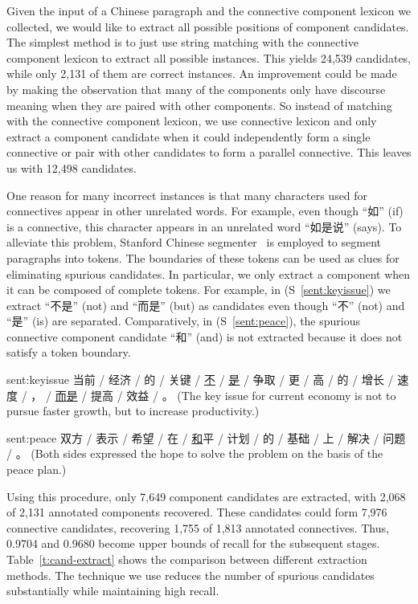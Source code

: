 Given the input of a Chinese paragraph and the connective component lexicon we collected,
we would like to extract all possible positions of component candidates.
The simplest method is to just use string matching with the connective
component lexicon to extract all possible instances. This yields
24,539 candidates, while only 2,131 of them are correct instances. An improvement
could be made by making the observation that many of the components only have
discourse meaning when they are paired with other components. So instead of matching
with the connective component lexicon, we use connective lexicon and only extract
a component candidate when it could independently form a single connective or pair
with other candidates to form a parallel connective.
This leaves us with 12,498 candidates.

One reason for many incorrect instances is that many characters used for connectives
appear in other unrelated words. For example, even though ``如'' (if) is a connective,
this character appears in an unrelated word ``如是说'' (says). To alleviate this problem,
Stanford Chinese segmenter~\citep{chang2008optimizing} is employed to segment paragraphs
into tokens. The boundaries of these tokens can be used as clues for eliminating spurious candidates.
In particular, we only extract a component when it can be composed of complete tokens.
For example, in (S~\ref{sent:keyissue}) we extract ``不是'' (not) and ``而是'' (but) as candidates
even though ``不'' (not) and ``是'' (is) are separated. Comparatively, in (S~\ref{sent:peace}),
the spurious connective component candidate ``和'' (and) is not extracted because it does
not satisfy a token boundary.

\begin{sent}{sent:keyissue}{}
    当前 / 经济 / 的 / 关键 / \underline{不} / \underline{是} / 争取 / 更 /
    高 / 的 / 增长 / 速度 / ， / \underline{而是} / 提高 / 效益 / 。
    (The key issue for current economy is not to pursue faster growth, but to
    increase productivity.)
\end{sent}

\begin{sent}{sent:peace}{}
    双方 / 表示 / 希望 / 在 / \underline{和}平 / 计划 / 的 / 基础 / 上 / 解决 / 问题 / 。
    (Both sides expressed the hope to solve the problem on the basis of the peace plan.)
\end{sent}

Using this procedure, only 7,649 component candidates are extracted, with 2,068 of 2,131 annotated
components recovered. These candidates could form 7,976 connective candidates, recovering
1,755 of 1,813 annotated connectives. Thus, 0.9704 and 0.9680 become upper bounds of recall
for the subsequent stages. Table~\ref{t:cand-extract} shows the comparison between different
extraction methods. The technique we use reduces the number of spurious candidates substantially while
maintaining high recall.

